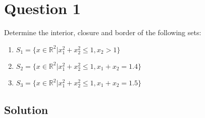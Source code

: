 
\section*{Question 1}

Determine the interior, closure and border of the following sets:

\begin{enumerate}[label=(\alph*)]
\item $S_1 = \{x \in \mathbb{R}^2 | x_1^2 + x_2^2 \leqslant 1, x_2 > 1 \}$

\item $S_2 = \{x \in \mathbb{R}^2 | x_1^2 + x_2^2 \leqslant 1, x_1 + x_2 = 1.4 \}$

\item $S_3 = \{x \in \mathbb{R}^2 | x_1^2 + x_2^2 \leqslant 1, x_1 + x_2 = 1.5 \} $
\end{enumerate}

\subsection*{Solution}

